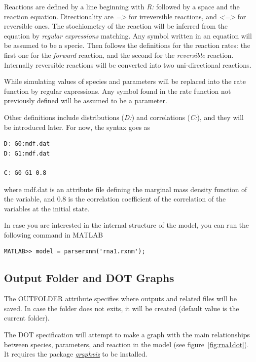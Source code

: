 \documentclass[letterpaper]{article}
\begin{document}
Reactions are defined by a line beginning with \emph{R:} followed by a
space and the reaction equation. Directionality are \emph{=>} for
irreversible reactions, and \emph{<=>} for reversible ones. The
stochiometry of the reaction will be inferred from the equation by
\emph{regular expressions} matching. Any symbol written in an equation
will be assumed to be a specie. Then follows the definitions for the
reaction rates: the first one for the \emph{forward} reaction, and the
second for the \emph{reversible} reaction. Internally reversible
reactions will be converted into two uni-directional reactions.
 
While simulating values of species and parameters will be replaced
into the rate function by regular expressions. Any symbol found in the
rate function not previously defined will be assumed to be a
parameter. 

Other definitions include distributions (\emph{D:}) and correlations
(\emph{C:}), and they will be introduced later. For now, the syntax
goes as
{\footnotesize
\begin{verbatim}
D: G0:mdf.dat
D: G1:mdf.dat

C: G0 G1 0.8
\end{verbatim}
}
where \textsf{mdf.dat} is an attribute file defining the marginal mass
density function of the variable, and 0.8 is the correlation
coefficient of the correlation of the variables at the initial state.

In case you are interested in the internal structure of the model,
you can run the following command in MATLAB
{\footnotesize
\begin{verbatim}
MATLAB>> model = parserxnm('rna1.rxnm');
\end{verbatim}
}

\subsection{Output Folder and DOT Graphs}

The OUTFOLDER attribute specifies where outputs and related files will
be saved.  In case the folder does not exits, it will be created
(default value is the current folder).

The DOT specification will attempt to make a graph with the main
relationships between species, parameters, and reaction in the model
(see figure~\ref{fig:rna1dot}). It requires the package
\href{http://www.graphviz.org/}{\emph{graphviz}} to be installed.
\end{document}
